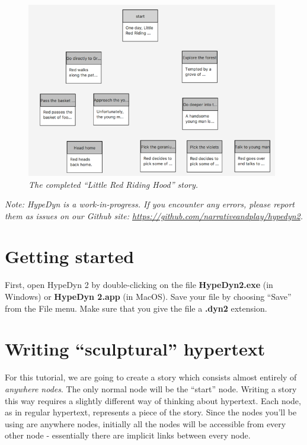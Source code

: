 \documentclass{article}
\begin{document}
\begin{figure}[h]
  \centering
  \includegraphics[width=11cm]{images/hypedyn-tutorial-3-figure-1}
  \caption{\textit{The completed ``Little Red Riding Hood'' story.}}
  \label{fig:tut3:completed}
\end{figure} 

\textit{Note:  HypeDyn is a work-in-progress. If you encounter any errors, please report them as issues on our Github site: \url{https://github.com/narrativeandplay/hypedyn2}.}

\section{Getting started}


First, open HypeDyn 2 by double-clicking on the file \textbf{HypeDyn2.exe} (in Windows) or \textbf{HypeDyn 2.app} (in MacOS). Save your file by choosing ``Save'' from the File menu. Make sure that you give the file a \textbf{.dyn2} extension.

\section{Writing ``sculptural'' hypertext}

For this tutorial, we are going to create a story which consists almost entirely of \textit{anywhere nodes}. The only normal node will be the ``start'' node. Writing a story this way requires a slightly different way of thinking about hypertext. Each node, as in regular hypertext, represents a piece of the story. Since the nodes you'll be using are anywhere nodes, initially all the nodes will be accessible from every other node - essentially there are implicit links between every node.
\end{document}
